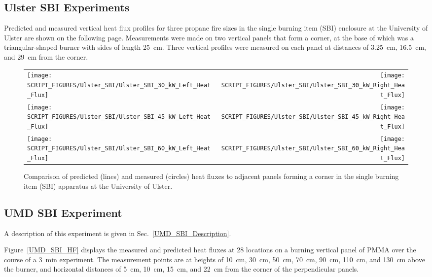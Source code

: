 \clearpage


\subsection{Ulster SBI Experiments}

Predicted and measured vertical heat flux profiles for three propane fire sizes in the single burning item (SBI) enclosure at the University of Ulster are shown on the following page. Measurements were made on two vertical panels that form a corner, at the base of which was a triangular-shaped burner with sides of length 25~cm. Three vertical profiles were measured on each panel at distances of 3.25~cm, 16.5~cm, and 29~cm from the corner.

\begin{figure}[h!]
\begin{tabular*}{\textwidth}{l@{\extracolsep{\fill}}r}
\texttt{[image: SCRIPT\_FIGURES/Ulster\_SBI/Ulster\_SBI\_30\_kW\_Left\_Heat\_Flux]} &
\texttt{[image: SCRIPT\_FIGURES/Ulster\_SBI/Ulster\_SBI\_30\_kW\_Right\_Heat\_Flux]} \\
\texttt{[image: SCRIPT\_FIGURES/Ulster\_SBI/Ulster\_SBI\_45\_kW\_Left\_Heat\_Flux]} &
\texttt{[image: SCRIPT\_FIGURES/Ulster\_SBI/Ulster\_SBI\_45\_kW\_Right\_Heat\_Flux]} \\
\texttt{[image: SCRIPT\_FIGURES/Ulster\_SBI/Ulster\_SBI\_60\_kW\_Left\_Heat\_Flux]} &
\texttt{[image: SCRIPT\_FIGURES/Ulster\_SBI/Ulster\_SBI\_60\_kW\_Right\_Heat\_Flux]}
\end{tabular*}
\label{Ulster_SBI}
\caption[Ulster SBI experiments, corner fire heat flux]
{Comparison of predicted (lines) and measured (circles) heat fluxes to adjacent panels forming a corner in the single
burning item (SBI) apparatus at the University of Ulster.}
\end{figure}

\clearpage

\subsection{UMD SBI Experiment}

A description of this experiment is given in Sec.~\ref{UMD_SBI_Description}.

Figure~\ref{UMD_SBI_HF} displays the measured and predicted heat fluxes at 28 locations on a burning vertical panel of PMMA over the course of a 3~min experiment. The measurement points are at heights of 10~cm, 30~cm, 50~cm, 70~cm, 90~cm, 110~cm, and 130~cm above the burner, and horizontal distances of 5~cm, 10~cm, 15~cm, and 22~cm from the corner of the perpendicular panels.

